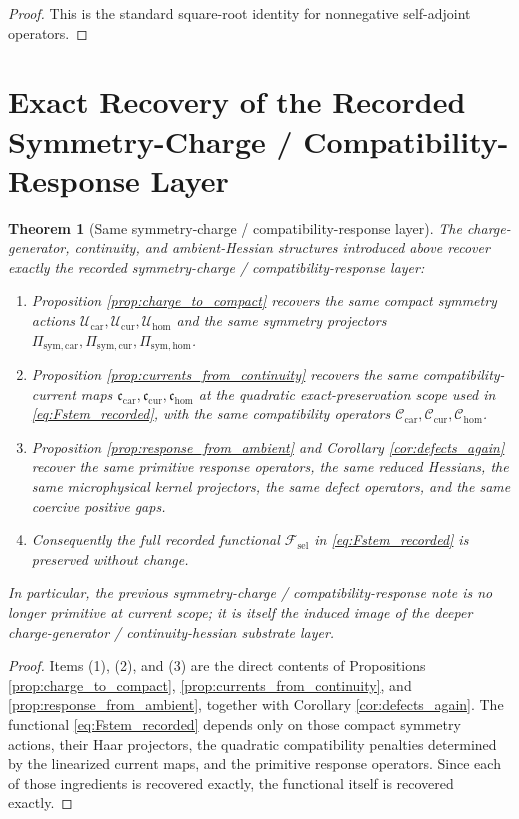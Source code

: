 \documentclass[11pt]{article}
\newcommand{\StemFunctional}{\mathscr F_{\mathrm{sel}}}
\newcommand{\TensorSymProj}{\Pi_{\mathrm{sym,car}}}
\newcommand{\CurSymProj}{\Pi_{\mathrm{sym,cur}}}
\newcommand{\HomSymProj}{\Pi_{\mathrm{sym,hom}}}
\newcommand{\TensorCompat}{\mathcal C_{\mathrm{car}}}
\newcommand{\CurCompat}{\mathcal C_{\mathrm{cur}}}
\newcommand{\HomCompat}{\mathcal C_{\mathrm{hom}}}
\newcommand{\TensorSymAct}{\mathscr U_{\mathrm{car}}}
\newcommand{\CurSymAct}{\mathscr U_{\mathrm{cur}}}
\newcommand{\HomSymAct}{\mathscr U_{\mathrm{hom}}}
\newcommand{\TensorCurrent}{\mathfrak c_{\mathrm{car}}}
\newcommand{\CurCurrent}{\mathfrak c_{\mathrm{cur}}}
\newcommand{\HomCurrent}{\mathfrak c_{\mathrm{hom}}}
\newtheorem{theorem}{Theorem}
\begin{document}
\begin{proof}
This is the standard square-root identity for nonnegative self-adjoint operators.
\end{proof}

\section{Exact Recovery of the Recorded Symmetry-Charge / Compatibility-Response Layer}

\begin{theorem}[Same symmetry-charge / compatibility-response layer]
\label{thm:same_layer}
The charge-generator, continuity, and ambient-Hessian structures introduced above recover exactly the recorded symmetry-charge / compatibility-response layer:
\begin{enumerate}
    \item Proposition \ref{prop:charge_to_compact} recovers the same compact symmetry actions \(\TensorSymAct,\CurSymAct,\HomSymAct\) and the same symmetry projectors \(\TensorSymProj,\CurSymProj,\HomSymProj\).
    \item Proposition \ref{prop:currents_from_continuity} recovers the same compatibility-current maps \(\TensorCurrent,\CurCurrent,\HomCurrent\) at the quadratic exact-preservation scope used in \eqref{eq:Fstem_recorded}, with the same compatibility operators \(\TensorCompat,\CurCompat,\HomCompat\).
    \item Proposition \ref{prop:response_from_ambient} and Corollary \ref{cor:defects_again} recover the same primitive response operators, the same reduced Hessians, the same microphysical kernel projectors, the same defect operators, and the same coercive positive gaps.
    \item Consequently the full recorded functional \(\StemFunctional\) in \eqref{eq:Fstem_recorded} is preserved without change.
\end{enumerate}
In particular, the previous symmetry-charge / compatibility-response note is no longer primitive at current scope; it is itself the induced image of the deeper charge-generator / continuity-hessian substrate layer.
\end{theorem}

\begin{proof}
Items (1), (2), and (3) are the direct contents of Propositions \ref{prop:charge_to_compact}, \ref{prop:currents_from_continuity}, and \ref{prop:response_from_ambient}, together with Corollary \ref{cor:defects_again}. The functional \eqref{eq:Fstem_recorded} depends only on those compact symmetry actions, their Haar projectors, the quadratic compatibility penalties determined by the linearized current maps, and the primitive response operators. Since each of those ingredients is recovered exactly, the functional itself is recovered exactly.
\end{proof}
\end{document}
